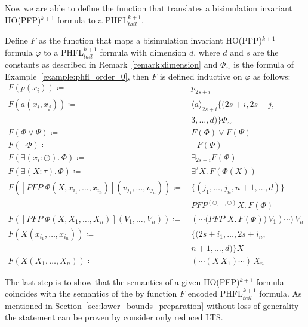 Now we are able to define the function that translates a bisimulation invariant HO(PFP)$^{k+1}$
formula to a PHFL$^{k+1}_{tail}$. 

\begin{definition}
    \label{definition:lower_bounds_phfl_formula_function_pfp}
   Define $F$ as the function that maps a bisimulation invariant HO(PFP)$^{k+1}$ formula $\varphi$ to a PHFL$^{k+1}_{tail}$ formula with dimension $d$, where $d$ and $s$ are the constants as described in Remark~\ref{remark:dimension} and $\Phi_\sim$ is the formula of Example~\ref{example:phfl_order_0}, then $F$ is defined
    inductive on $\varphi$ as follows:
    \begin{align*}
        F(p(x_i)) \coloneqq &\, p_{2s+i} \\
        F(a(x_i, x_j)) \coloneqq &\, \langle a \rangle_{2s+i} \{(2s+i, 2s+j, \\
        &\,3, \dots, d)\} \Phi_\sim \\
        F(\Phi \vee \Psi) \coloneqq &\, F(\Phi) \vee F(\Psi) \\
        F(\neg \Phi) \coloneqq &\, \neg F(\Phi) \\
        F(\exists (x_i \colon \odot).\,\Phi) \coloneqq &\, \exists_{2s+i} F(\Phi) \\
        F(\exists (X \colon \tau).\,\Phi) \coloneqq &\, \exists^\tau X.\,F(\Phi(X)) \\
        F([PFP\;\Phi(X, x_{i_1}, \dots, x_{i_n})](v_{j_1}, \dots, v_{j_n})) \coloneqq &\,\{(j_1, \dots, j_n, n + 1, \dots, d)\} \\
        &\,PFP^{(\odot, \dots, \odot)} X.\, F(\Phi) \\
        F([PFP\;\Phi(X, X_1, \dots, X_n)](V_1, \dots, V_n)) \coloneqq &\,(\dotsb \big(PFP^\tau X.\, F(\Phi)\big)\,V_1)\dotsb)\,V_n \\
        F(X(x_{i_1}, \dots, x_{i_n})) \coloneqq &\, \{(2s+i_1, \dots, 2s+i_n, \\
        &\,n + 1, \dots, d)\}X\\
        F(X(X_1, \dots, X_n)) \coloneqq &\, (\dotsb (X\,X_1)\dotsb)\,X_n
    \end{align*}
\end{definition}

The last step is to show that the semantics of a given HO(PFP)$^{k+1}$ formula coincides with the semantics of the by function $F$ encoded PHFL$^{k+1}_{tail}$ formula. As mentioned in Section~\ref{sec:lower_bounds_preparation} without loss of generality the statement can be proven by consider only  reduced LTS. 

